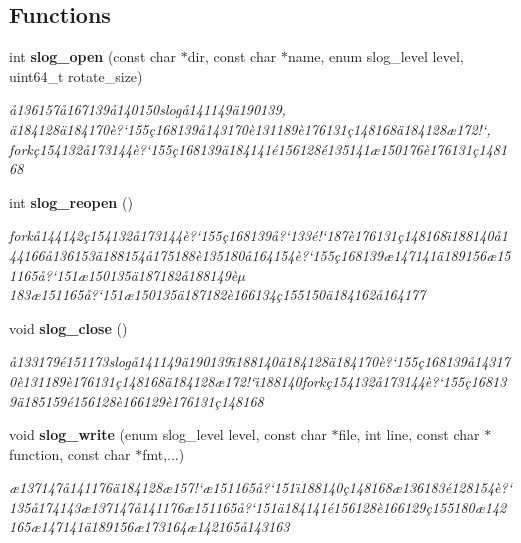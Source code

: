 \subsection*{Functions}
\begin{CompactItemize}
\item 
int {\bf slog\_\-open} (const char $\ast$dir, const char $\ast$name, enum slog\_\-level level, uint64\_\-t rotate\_\-size)
\begin{CompactList}\small\item\em \aa{}136157\aa{}167139\aa{}140150slog\aa{}141149\"{a}190139, \"{a}184128\"{a}184170\`{e}?`155\c{c}168139\aa{}143170\`{e}131189\`{e}176131\c{c}148168\"{a}184128\ae{}172!`, fork\c{c}154132\aa{}173144\`{e}?`155\c{c}168139\"{a}184141\'{e}156128\'{e}135141\ae{}150176\`{e}176131\c{c}148168 \item\end{CompactList}\item 
int {\bf slog\_\-reopen} ()
\begin{CompactList}\small\item\em fork\aa{}144142\c{c}154132\aa{}173144\`{e}?`155\c{c}168139\aa{}?`133\'{e}!`187\`{e}176131\c{c}148168\"{\i}188140\aa{}144166\aa{}136153\"{a}188154\aa{}175188\`{e}135180\aa{}164154\`{e}?`155\c{c}168139\ae{}147141\"{a}189156\ae{}151165\aa{}?`151\ae{}150135\"{a}187182\aa{}188149\`{e}$\mu$183\ae{}151165\aa{}?`151\ae{}150135\"{a}187182\`{e}166134\c{c}155150\"{a}184162\aa{}164177 \item\end{CompactList}\item 
void {\bf slog\_\-close} ()
\begin{CompactList}\small\item\em \aa{}133179\'{e}151173slog\aa{}141149\"{a}190139\"{\i}188140\"{a}184128\"{a}184170\`{e}?`155\c{c}168139\aa{}143170\`{e}131189\`{e}176131\c{c}148168\"{a}184128\ae{}172!`\"{\i}188140fork\c{c}154132\aa{}173144\`{e}?`155\c{c}168139\"{a}185159\'{e}156128\`{e}166129\`{e}176131\c{c}148168 \item\end{CompactList}\item 
void {\bf slog\_\-write} (enum slog\_\-level level, const char $\ast$file, int line, const char $\ast$function, const char $\ast$fmt,...)
\begin{CompactList}\small\item\em \ae{}137147\aa{}141176\"{a}184128\ae{}157!`\ae{}151165\aa{}?`151\"{\i}188140\c{c}148168\ae{}136183\'{e}128154\`{e}?`135\aa{}174143\ae{}137147\aa{}141176\ae{}151165\aa{}?`151\"{a}184141\'{e}156128\`{e}166129\c{c}155180\ae{}142165\ae{}147141\"{a}189156\ae{}173164\ae{}142165\aa{}143163 \item\end{CompactList}\item 

\end{CompactItemize}
